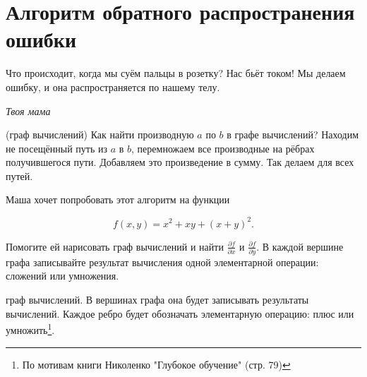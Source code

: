 
\section{Алгоритм обратного распространения ошибки}

\epigraph{Что происходит, когда мы суём пальцы в розетку? Нас бьёт током! Мы делаем ошибку, и она распространяется по нашему телу.}{\textit{Твоя мама}}


\begin{problem}{(граф вычислений)}
    Как найти производную $a$ по $b$ в графе вычислений? Находим не посещённый путь из $a$ в $b$, перемножаем все производные на рёбрах получившегося пути. Добавляем это произведение в сумму. Так делаем для всех путей. 
    
    Маша хочет попробовать этот алгоритм на функции
    
    $$
    f(x,y) = x^2 + xy + (x + y)^2.
    $$ 
    
    Помогите ей нарисовать граф вычислений и найти $\frac{\partial f}{\partial x}$ и $\frac{\partial f}{\partial y}.$ В каждой вершине графа записывайте результат вычисления одной элементарной операции: сложений или умножения. 
    
    граф вычислений. В вершинах графа она будет записывать результаты вычислений. Каждое ребро будет обозначать элементарную операцию: плюс или умножить\footnote{По мотивам книги Николенко "Глубокое обучение" (стр. 79)}.
\end{problem} 

